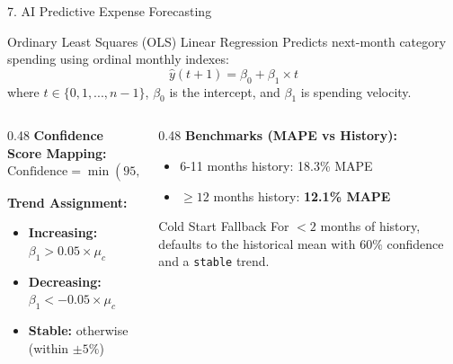 \documentclass[10pt,aspectratio=169]{beamer}
\begin{document}
\begin{frame}{7. AI Predictive Expense Forecasting}
    \begin{block}{Ordinary Least Squares (OLS) Linear Regression}
        Predicts next-month category spending using ordinal monthly indexes:
        $$\hat{y}(t+1) = \beta_0 + \beta_1 \times t$$
        where $t \in \{0, 1, ..., n-1\}$, $\beta_0$ is the intercept, and $\beta_1$ is spending velocity.
    \end{block}

    \begin{columns}[T]
        \begin{column}{0.48\textwidth}
            \textbf{Confidence Score Mapping:}
            $$\text{Confidence} = \min(95, 50 + R^2 \times 45) \to [50, 95]\%$$
            
            \textbf{Trend Assignment:}
            \begin{itemize}
                \item \textbf{Increasing:} $\beta_1 > 0.05 \times \mu_c$
                \item \textbf{Decreasing:} $\beta_1 < -0.05 \times \mu_c$
                \item \textbf{Stable:} otherwise (within $\pm 5\%$)
            \end{itemize}
        \end{column}
        \begin{column}{0.48\textwidth}
            \textbf{Benchmarks (MAPE vs History):}
            \begin{itemize}
                \item 6-11 months history: 18.3\% MAPE
                \item $\ge 12$ months history: \textbf{12.1\% MAPE}
            \end{itemize}
            \begin{block}{Cold Start Fallback}
                For $< 2$ months of history, defaults to the historical mean with $60\%$ confidence and a \texttt{stable} trend.
            \end{block}
        \end{column}
    \end{columns}
\end{frame}
\end{document}
